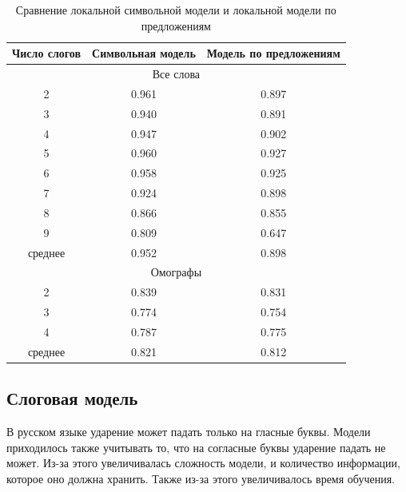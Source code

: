 \documentclass[14pt, a4paper, russian]{report}
\begin{document}
\begin{normalsize}
\begin{table}[H]
		\caption{Сравнение локальной символьной модели и локальной модели по предложениям}
	\begin{small}
		\begin{center}
			\begin{tabular}{|c|c|c|}
				\hline
				Число слогов & Символьная модель & Модель по предложениям \\ \hline
				\multicolumn{3}{|c|}{Все слова}                          \\ \hline
				     2       &      0.961       &         0.897          \\ \hline
				     3       &      0.940       &         0.891          \\ \hline
				     4       &      0.947       &         0.902          \\ \hline
				     5       &      0.960       &         0.927          \\ \hline
				     6       &      0.958       &         0.925          \\ \hline
				     7       &      0.924       &         0.898          \\ \hline
				     8       &      0.866       &         0.855          \\ \hline
				     9       &      0.809       &         0.647          \\ \hline
				  среднее    &      0.952       &         0.898          \\ \hline
				\multicolumn{3}{|c|}{Омографы}                           \\ \hline
				     2       &      0.839       &         0.831          \\ \hline
				     3       &      0.774       &         0.754          \\ \hline
				     4       &      0.787       &         0.775          \\ \hline
				  среднее    &      0.821       &         0.812          \\ \hline
			\end{tabular}
		\end{center}
	\end{small}

	\label{table:local_sent}
\end{table}

\subsection{Слоговая модель}
\label{syl_descr}
В русском языке ударение может падать только на гласные буквы. Модели приходилось также учитывать то, что на согласные буквы ударение падать не может. Из-за этого увеличивалась сложность модели, и количество информации, которое оно должна хранить. Также из-за этого увеличивалось время обучения.


\end{normalsize}
\end{document}
